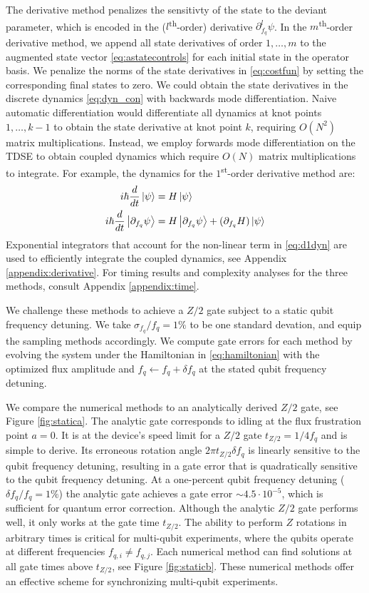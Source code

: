 The derivative method penalizes the sensitivty of the state
to the deviant parameter, which is encoded in the ($l$\textsuperscript{th}-order)
derivative $\partial_{f_{q}}^{l} \psi$. In the $m$\textsuperscript{th}-order
derivative method, we append all state derivatives of order $1, \dots, m$
to the augmented state vector \eqref{eq:astatecontrols}
for each initial state in the operator basis.
We penalize the norms of the state derivatives
in \eqref{eq:costfun} by setting the corresponding final states to zero.
We could obtain the state derivatives in the discrete dynamics \eqref{eq:dyn_con}
with backwards mode differentiation.
Naive automatic differentiation 
would differentiate all dynamics at knot points
$1, \dots, k - 1$ to obtain the state derivative at knot point $k$, requiring
$O(N^{2})$ matrix multiplications. Instead, we 
employ forwards mode differentiation on the TDSE to obtain coupled dynamics
which require $O(N)$ matrix multiplications to integrate.
For example, the dynamics for the $1$\textsuperscript{st}-order derivative method are:
\begin{align}
  i \hbar \frac{d}{dt} \ket{\psi} &= H \ket{\psi}\\
  i \hbar \frac{d}{dt} \ket{\partial_{f_{q}}\psi} &=
  H \ket{\partial_{f_{q}} \psi} +
  (\partial_{f_{q}} H) \ket{\psi}
  \label{eq:d1dyn}
\end{align}
Exponential integrators that account for the non-linear
term in \eqref{eq:d1dyn} are used to efficiently integrate the coupled dynamics,
see Appendix \ref{appendix:derivative}. For timing
results and complexity analyses for the three methods,
consult Appendix \ref{appendix:time}.

We challenge these methods to achieve
a $Z/2$ gate subject to a static qubit frequency detuning.
We take $\sigma_{f_{q}} / f_{q} = 1\%$ to be one standard devation, and equip
the sampling methods accordingly. We compute gate errors for each method
by evolving the system under the Hamiltonian in \eqref{eq:hamiltonian}
with the optimized flux amplitude and $f_{q} \gets f_{q} + \delta f_{q}$
at the stated qubit frequency detuning.

We compare the numerical methods
to an analytically derived $Z/2$ gate, see Figure \ref{fig:statica}. 
The analytic gate corresponds to
idling at the flux frustration point $a = 0$. It
is at the device's speed limit for a $Z/2$ gate $t_{Z/2} = 1 / 4 f_{q}$ and
is simple to derive. Its erroneous rotation angle
$2 \pi t_{Z/2} \delta f_{q}$ is linearly sensitive to
the qubit frequency detuning, resulting in a gate error that is quadratically sensitive
to the qubit frequency detuning.
At a one-percent
qubit frequency detuning ($\delta f_{q} / f_{q} = 1\%$)
the analytic gate achieves a gate error $\sim 4.5 \cdot 10^{-5}$,
which is sufficient for quantum error correction.
Although the analytic $Z/2$ gate performs well, it
only works at the gate time $t_{Z/2}$. The ability to perform $Z$
rotations in arbitrary times is critical
for multi-qubit experiments, where the qubits operate at different
frequencies $f_{q, i} \neq f_{q, j}$.
Each numerical method can find solutions at
all gate times above $t_{Z/2}$, see Figure \ref{fig:staticb}.
These numerical methods offer an effective scheme for synchronizing
multi-qubit experiments.

